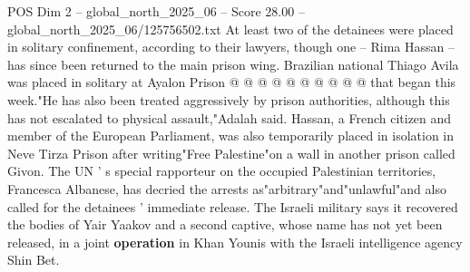 \begin{textsample}{POS Dim 2 – global\_north\_2025\_06 – Score 28.00 – global\_north\_2025\_06/125756502.txt}
At least two of the detainees were placed in solitary confinement, according to their lawyers, though one -- Rima Hassan -- has since been returned to the main prison wing.
Brazilian national Thiago Avila was placed in solitary at Ayalon Prison @ @ @ @ @ @ @ @ @ @ that began this week."He has also been treated aggressively by prison authorities, although this has not escalated to physical assault,"Adalah said.
Hassan, a French citizen and member of the European Parliament, was also temporarily placed in isolation in Neve Tirza Prison after writing"Free Palestine"on a wall in another prison called Givon.
The UN ' s special rapporteur on the occupied Palestinian territories, Francesca Albanese, has decried the arrests as"arbitrary"and"unlawful"and also called for the detainees ' immediate release.
The Israeli military says it recovered the bodies of Yair Yaakov and a second captive, whose name has not yet been released, in a joint \textbf{operation} in Khan Younis with the Israeli intelligence agency Shin Bet.

\end{textsample}
